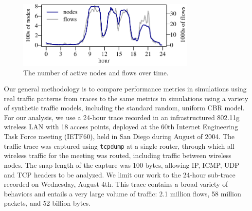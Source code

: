 \documentclass[conference]{IEEEtran}
\newcommand{\caps}[1]{{\small{#1}}}
\begin{document}
\begin{figure}
\begin{center}
\includegraphics[width=3.5in]{nodes-flows}%
\vspace{-0.75em}%
\caption{The number of active nodes and flows over time.} 
\label{fig:nodes-flows}
\end{center}
\vspace{-2em}
\end{figure}

Our general methodology is to compare performance metrics in simulations using real traffic patterns from traces to the same metrics in simulations using a variety of synthetic traffic models, including the standard random, uniform \caps{CBR} model. For our analysis, we use a 24-hour trace recorded in an infrastructured 802.11g wireless \caps{LAN} with 18 access points, deployed at the 60th Internet Engineering Task Force meeting (\caps{IETF60}), held in San Diego during August of 2004. The traffic trace was captured using \texttt{\small{tcpdump}} at a single router, through which all wireless traffic for the meeting was routed, including traffic between wireless nodes. The snap length of the capture was 100 bytes, allowing \caps{IP}, \caps{ICMP}, \caps{UDP} and \caps{TCP} headers to be analyzed. We limit our work to the 24-hour sub-trace recorded on Wednesday, August 4th. This trace contains a broad variety of behaviors and entails a very large volume of traffic: 2.1 million flows, 58 million packets, and 52 billion bytes.
\end{document}
